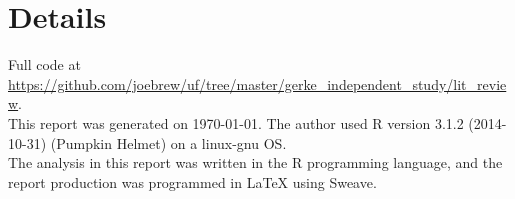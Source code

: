\documentclass[11pt]{article}
\begin{document}
{}



\section*{Details}
\hrulefill

\vspace{10mm}
Full code at \href{https://github.com/joebrew/uf/tree/master/gerke\_independent\_study/lit\_review}{https://github.com/joebrew/uf/tree/master/gerke\_independent\_study/lit\_review}. \\

This report was generated on \today.  The author used R version 3.1.2 (2014-10-31) (Pumpkin Helmet) on a linux-gnu OS.  \\

The analysis in this report was written in the R programming language, and the report production was programmed in \LaTeX{} using Sweave.\\
\end{document}
